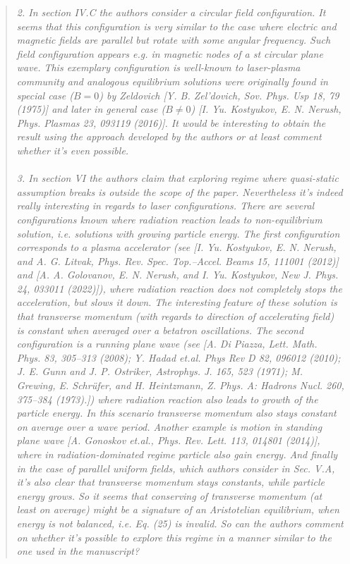 \documentclass{article}
\begin{document}
\begin{quote}\textit{2. In section IV.C the authors consider a circular field
configuration. It seems that this configuration is very similar to the
case where electric and magnetic fields are parallel but rotate with
some angular frequency. Such field configuration appears e.g. in
magnetic nodes of a st circular plane wave. This exemplary
configuration is well-known to laser-plasma community and analogous
equilibrium solutions were originally found in special case ($B = 0$)
by Zeldovich [Y. B. Zel’dovich, Sov. Phys. Usp 18, 79 (1975)] and
later in general case ($B \neq 0$) [I. Yu. Kostyukov, E. N. Nerush,
Phys. Plasmas 23, 093119 (2016)]. It would be interesting to obtain
the result using the approach developed by the authors or at least
comment whether it's even possible.\\
\\
3. In section VI the authors claim that exploring regime where
quasi-static assumption breaks is outside the scope of the paper.
Nevertheless it's indeed really interesting in regards to laser
configurations. There are several configurations known where radiation
reaction leads to non-equilibrium solution, i.e. solutions with
growing particle energy. The first configuration corresponds to a
plasma accelerator (see [I. Yu. Kostyukov, E. N. Nerush, and A. G.
Litvak, Phys. Rev. Spec. Top.–Accel. Beams 15, 111001 (2012)] and [A.
A. Golovanov, E. N. Nerush, and I. Yu. Kostyukov, New J. Phys. 24,
033011 (2022)]), where radiation reaction does not completely stops
the acceleration, but slows it down. The interesting feature of these
solution is that transverse momentum (with regards to direction of
accelerating field) is constant when averaged over a betatron
oscillations. The second configuration is a running plane wave (see
[A. Di Piazza, Lett. Math. Phys. 83, 305–313 (2008); Y. Hadad et.al.
Phys Rev D 82, 096012 (2010); J. E. Gunn and J. P. Ostriker,
Astrophys. J. 165, 523 (1971); M. Grewing, E. Schrüfer, and H.
Heintzmann, Z. Phys. A: Hadrons Nucl. 260, 375–384 (1973).]) where
radiation reaction also leads to growth of the particle energy. In
this scenario transverse momentum also stays constant on average over
a wave period. Another example is motion in standing plane wave [A.
Gonoskov et.al., Phys. Rev. Lett. 113, 014801 (2014)], where in
radiation-dominated regime particle also gain energy. And finally in
the case of parallel uniform fields, which authors consider in Sec.
V.A, it's also clear that transverse momentum stays constants, while
particle energy grows. So it seems that conserving of transverse
momentum (at least on average) might be a signature of an Aristotelian
equilibrium, when energy is not balanced, i.e. Eq. (25) is invalid. So
can the authors comment on whether it's possible to explore this
regime in a manner similar to the one used in the manuscript?}\end{quote}
\end{document}
